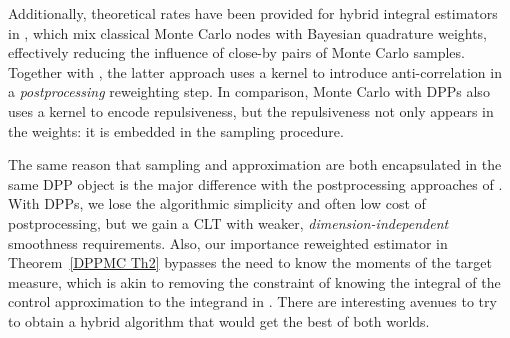 \documentclass[a4paper,11pt]{article}
\numberwithin{equation}{section}
\theoremstyle{definition}
\newcommand{\rev}[1]{#1}
\begin{document}
Additionally, theoretical rates have been provided for hybrid integral
estimators in \cite[Theorem 1]{BOGO15}, which mix classical Monte Carlo nodes
with Bayesian quadrature weights, effectively reducing the influence of close-by
pairs of Monte Carlo samples. Together with \citep{DePo16}, the latter approach
uses a kernel to introduce anti-correlation in a \emph{postprocessing} reweighting
step. In comparison, Monte Carlo with DPPs also uses a kernel to encode repulsiveness, but the repulsiveness not only appears in the weights: it is embedded in the sampling procedure.

\rev{The same reason that sampling and approximation are both encapsulated in the same DPP object is the major difference with the postprocessing approaches of \citep{OaGiCh17,LiLe17}. With DPPs, we lose the algorithmic simplicity and often low cost of postprocessing, but we gain a CLT with weaker, \emph{dimension-independent} smoothness requirements. Also, our importance reweighted estimator in Theorem~\ref{DPPMC Th2} bypasses the need to know the moments of the target measure, which is akin to removing the constraint of knowing the integral of the control approximation to the integrand in \citep{OaGiCh17}. There are interesting avenues to try to obtain a hybrid algorithm that would get the best of both worlds.}
\end{document}
